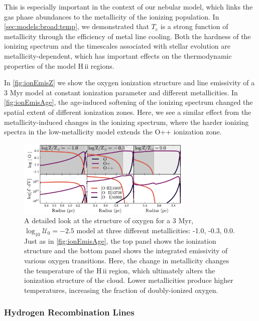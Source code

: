 \documentclass[linenumbers, tighten, trackchanges]{aastex61}%
\newcommand{\Fig}[1]{\autoref{fig:#1}}
\newcommand{\Sec}[1]{\autoref{sec:#1}}
\newcommand{\logten}{\ensuremath{\log_{10}}}
\newcommand{\Te}{\ensuremath{T_{e}}}
\newcommand{\hii}{H\,{\sc ii}\xspace}
\newcommand{\logU}{\ensuremath{\logten \mathcal{U}_0}}
\begin{document}
This is especially important in the context of our nebular model, which links the gas phase abundances to the metallicity of the ionizing population. In \Sec{models:broad:temp}, we demonstrated that \Te{} is a strong function of metallicity through the efficiency of metal line cooling. Both the hardness of the ionizing spectrum and the timescales associated with stellar evolution are metallicity-dependent, which has important effects on the thermodynamic properties of the model \hii regions.

In \Fig{ionEmisZ} we show the oxygen ionization structure and line emissivity of a 3 Myr model at constant ionization parameter and different metallicities. In \Fig{ionEmisAge}, the age-induced softening of the ionizing spectrum changed the spatial extent of different ionization zones. Here, we see a similar effect from the metallicity-induced changes in the ionizing spectrum, where the harder ionizing spectra in the low-metallicity model extends the O++ ionization zone.

\begin{figure}[!htbp]
  \begin{centering}
    \includegraphics[width=0.75\textwidth]{f8.pdf}
    \caption{A detailed look at the structure of oxygen for a 3 Myr, $\logU = -2.5$ model at three different metallicities: -1.0, -0.3, 0.0. Just as in \Fig{ionEmisAge}, the top panel shows the ionization structure and the bottom panel shows the integrated emissivity of various oxygen transitions. Here, the change in metallicity changes the temperature of the \hii region, which ultimately alters the ionization structure of the cloud. Lower metallicities produce higher temperatures, increasing the fraction of doubly-ionized oxygen.}
    \label{fig:ionEmisZ}
  \end{centering}
\end{figure}

\subsubsection{Hydrogen Recombination Lines} \label{sec:models:broad:H}
\end{document}
